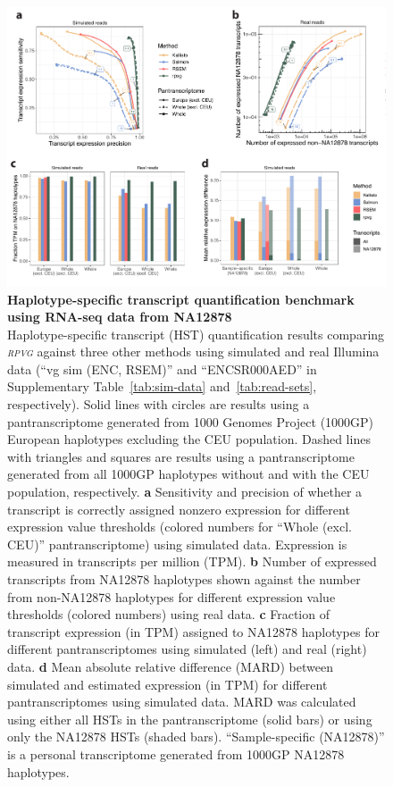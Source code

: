 \documentclass[11pt]{ucthesis}
\newcommand{\tool}[1]{\emph{\textsc{#1}}}
\begin{document}
\begin{figure}[h!]
\ssp
\begin{center}
\includegraphics[width=.85\textwidth]{mpmapfigures/figure3.pdf}
\caption{\textbf{Haplotype-specific transcript quantification benchmark using RNA-seq data from NA12878} \\
Haplotype-specific transcript (HST) quantification results comparing \tool{rpvg} against three other methods using simulated and real Illumina data (``vg sim (ENC, RSEM)'' and ``ENCSR000AED'' in Supplementary Table~\ref{tab:sim-data} and~\ref{tab:read-sets}, respectively). Solid lines with circles are results using a pantranscriptome generated from 1000 Genomes Project (1000GP) European haplotypes excluding the CEU population. Dashed lines with triangles and squares are results using a pantranscriptome generated from all 1000GP haplotypes without and with the CEU population, respectively. \textbf{a} Sensitivity and precision of whether a transcript is correctly assigned nonzero expression for different expression value thresholds (colored numbers for ``Whole (excl. CEU)'' pantranscriptome) using simulated data. Expression is measured in transcripts per million (TPM). \textbf{b} Number of expressed transcripts from NA12878 haplotypes shown against the number from non-NA12878 haplotypes for different expression value thresholds (colored numbers) using real data. \textbf{c} Fraction of transcript expression (in TPM) assigned to NA12878 haplotypes for different pantranscriptomes using simulated (left) and real (right) data. \textbf{d} Mean absolute relative difference (MARD) between simulated and estimated expression (in TPM) for different pantranscriptomes using simulated data. MARD was calculated using either all HSTs in the pantranscriptome (solid bars) or using only the NA12878 HSTs (shaded bars). ``Sample-specific (NA12878)'' is a personal transcriptome generated from 1000GP NA12878 haplotypes.  
} \label{fig:expression}
\end{center}
\end{figure}
\end{document}
